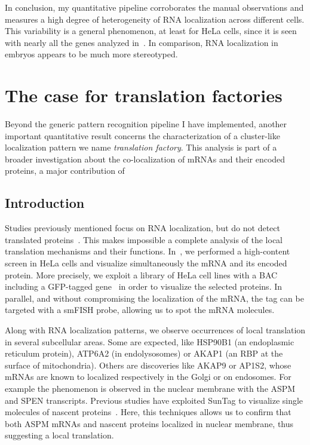 In conclusion, my quantitative pipeline corroborates the manual observations and measures a high degree of heterogeneity of \ac{RNA} localization across different cells.
This variability is a general phenomenon, at least for HeLa cells, since it is seen with nearly all the genes analyzed in~\cite{CHOUAIB_2020}.
In comparison, \ac{RNA} localization in embryos appears to be much more stereotyped.

\section{The case for translation factories}
\label{sec:translation_factories}

Beyond the generic pattern recognition pipeline I have implemented, another important quantitative result concerns the characterization of a cluster-like localization pattern we name \emph{translation factory}.
This analysis is part of a broader investigation about the co-localization of \ac{mRNA}s and their encoded proteins, a major contribution of~\cite{CHOUAIB_2020}

\subsection{Introduction}
\label{subsec:introduction_translation_factories}

Studies previously mentioned focus on \ac{RNA} localization, but do not detect translated proteins~\cite{lecuyer_global_2007, battich_image-based_2013, Chen_2015, eng_seqfish_2019, Xia_2019}.
This makes impossible a complete analysis of the local translation mechanisms and their functions.
In~\cite{CHOUAIB_2020}, we performed a high-content screen in HeLa cells and visualize simultaneously the \ac{mRNA} and its encoded protein.
More precisely, we exploit a library of HeLa cell lines with a \ac{BAC} including a \ac{GFP}-tagged gene~\cite{poser_bac_2008} in order to visualize the selected proteins.
In parallel, and without compromising the localization of the \ac{mRNA}, the tag can be targeted with a \ac{smFISH} probe, allowing us to spot the \ac{mRNA} molecules.

Along with \ac{RNA} localization patterns, we observe occurrences of local translation in several subcellular areas.
Some are expected, like HSP90B1 (an endoplasmic reticulum protein), ATP6A2 (in endolysosomes) or AKAP1 (an \ac{RBP} at the surface of mitochondria).
Others are discoveries like AKAP9 or AP1S2, whose \ac{mRNA}s are known to localized respectively in the Golgi or on endosomes.
For example the phenomenon is observed in the nuclear membrane with the ASPM and SPEN transcripts.
Previous studies have exploited SunTag to visualize single molecules of nascent proteins~\cite{pichon_visualization_2016, Pichon_2018, Wu_2016}.
Here, this techniques allows us to confirm that both ASPM \ac{mRNA}s and nascent proteins localized in nuclear membrane, thus suggesting a local translation.

